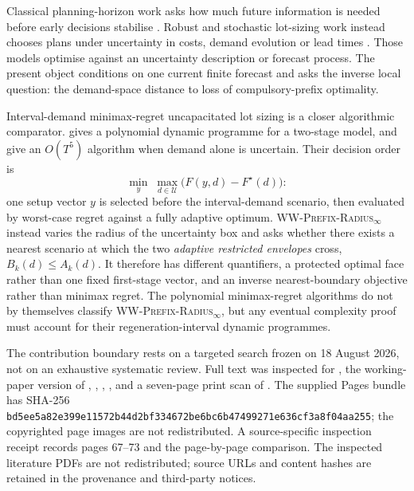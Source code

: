 \documentclass[11pt]{article}
\theoremstyle{definition}
\newcommand{\WWR}{\textsc{WW-Prefix-Radius}\ensuremath{_{\infty}}}
\begin{document}
Classical planning-horizon work asks how much future information is needed before early decisions stabilise \parencite{EppenEtAl1969,LundinMorton1975,LeeDenardo1986,BesSethi1988,ChandSethi1990,FedergruenTzur1994,FedergruenTzur1995,DawandeEtAl2006,DawandeEtAl2007}. Robust and stochastic lot-sizing work instead chooses plans under uncertainty in costs, demand evolution or lead times \parencite{HanafizadehEtAl2019,ForelGrunow2023,WeijersEtAl2025,GuillaumeEtAl2026,LiRomeroMorales2017}. Those models optimise against an uncertainty description or forecast process. The present object conditions on one current finite forecast and asks the inverse local question: the demand-space distance to loss of compulsory-prefix optimality.

Interval-demand minimax-regret uncapacitated lot sizing is a closer algorithmic comparator. \Textcite{Zhang2011} gives a polynomial dynamic programme for a two-stage model, and \textcite{LiRomeroMorales2013} give an $O(T^5)$ algorithm when demand alone is uncertain. Their decision order is
\[
  \min_y\;\max_{d\in\mathcal U}
  \bigl(F(y,d)-F^\star(d)\bigr):
\]
one setup vector $y$ is selected before the interval-demand scenario, then evaluated by worst-case regret against a fully adaptive optimum. \WWR{} instead varies the radius of the uncertainty box and asks whether there exists a nearest scenario at which the two \emph{adaptive restricted envelopes} cross, $B_k(d)\le A_k(d)$. It therefore has different quantifiers, a protected optimal face rather than one fixed first-stage vector, and an inverse nearest-boundary objective rather than minimax regret. The polynomial minimax-regret algorithms do not by themselves classify \WWR{}, but any eventual complexity proof must account for their regeneration-interval dynamic programmes.

The contribution boundary rests on a targeted search frozen on 18 August 2026, not on an exhaustive systematic review. Full text was inspected for \textcite{VanHoeselWagelmans1993}, the working-paper version of \textcite{ChakravartiWagelmans1998}, \textcite{WeijersEtAl2025}, \textcite{LiRomeroMorales2013}, \textcite{EgriEtAl2014}, and a seven-page print scan of \textcite{RichterVoros1989}. The supplied Pages bundle has SHA-256 \nolinkurl{bd5ee5a82e399e11572b44d2bf334672be6bc6b47499271e636cf3a8f04aa255}; the copyrighted page images are not redistributed. A source-specific inspection receipt records pages 67--73 and the page-by-page comparison. The inspected literature PDFs are not redistributed; source URLs and content hashes are retained in the provenance and third-party notices.
\end{document}
